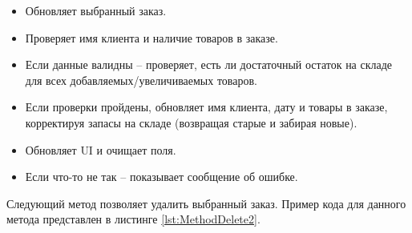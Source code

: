 \documentclass[12pt]{article}
\newcommand{\colorGIT}[1]{\textcolor{CtpLavender}{#1}}
\renewcommand{\texttt}[1]{{\small\ttfamily #1}}
\newenvironment{code}
  {\par\captionsetup{type=listing}\noindent}
  {\par\vspace{\baselineskip}}
\numberwithin{listing}{section}
\numberwithin{figure}{section}
\begin{document}
\begin{itemize}
	\item Обновляет выбранный заказ.
	\item Проверяет имя клиента и наличие товаров в заказе.
	\item Если данные валидны -- проверяет, есть ли достаточный остаток на складе для всех добавляемых/увеличиваемых товаров.
	\item Если проверки пройдены, обновляет имя клиента, дату и товары в заказе, корректируя запасы на складе (возвращая старые и забирая новые).
	\item Обновляет \texttt{UI} и очищает поля.
	\item Если что-то не так -- показывает сообщение об ошибке.
\end{itemize}

Следующий метод позволяет удалить выбранный заказ. Пример кода для данного метода представлен в листинге \ref{lst:MethodDelete2}.

\begin{code}
	\inputminted[firstline=268, lastline=295]{csharp}{../3lab/StoreManager/MainWindow.xaml.cs}
	\caption{\colorGIT{\href{https://github.com/WebMasterIT/Csharp_Labs/blob/ec375afd16c0647b337cf3d8a79c8bef904fc1be/3lab/StoreManager/MainWindow.xaml.cs\#L268-L295}{Метод}} удаления заказа}
	\label{lst:MethodDelete2}
\end{code}
\end{document}
